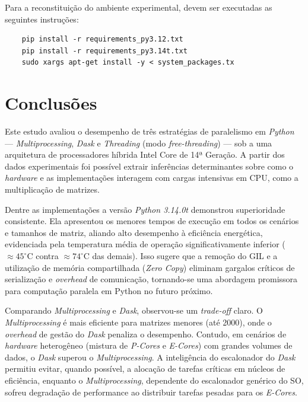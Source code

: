 \documentclass[acmsmall]{acmart}
\begin{document}
Para a reconstituição do ambiente experimental, devem ser executadas as seguintes instruções:

\begin{verbatim}
	pip install -r requirements_py3.12.txt
	pip install -r requirements_py3.14t.txt
	sudo xargs apt-get install -y < system_packages.tx
\end{verbatim}


\section{Conclusões}

Este estudo avaliou o desempenho de três estratégias de paralelismo em \textit{Python} — \textit{Multiprocessing}, \textit{Dask} e \textit{Threading} (modo \textit{free-threading}) — sob a uma arquitetura de processadores híbrida Intel Core de 14ª Geração. A partir dos dados experimentais foi possível extrair inferências determinantes sobre como o \textit{hardware} e as implementações interagem com cargas intensivas em CPU, como a multiplicação de matrizes.

Dentre as implementações a versão \textit{Python 3.14.0t} demonstrou superioridade consistente. Ela apresentou os menores tempos de execução em todos os cenários e tamanhos de matriz, aliando alto desempenho à eficiência energética, evidenciada pela temperatura média de operação significativamente inferior ($\approx 45^\circ\text{C}$ contra $\approx 74^\circ\text{C}$ das demais). Isso sugere que a remoção do GIL e a utilização de memória compartilhada (\textit{Zero Copy}) eliminam gargalos críticos de serialização e \textit{overhead} de comunicação, tornando-se uma abordagem promissora para computação paralela em Python no futuro próximo.

Comparando \textit{Multiprocessing} e \textit{Dask}, observou-se um \textit{trade-off} claro. O \textit{Multiprocessing} é mais eficiente para matrizes menores (até 2000), onde o \textit{overhead} de gestão do \textit{Dask} penaliza o desempenho. Contudo, em cenários de \textit{hardware} heterogêneo (mistura de \textit{P-Cores} e \textit{E-Cores}) com grandes volumes de dados, o \textit{Dask} superou o \textit{Multiprocessing}. A inteligência do escalonador do \textit{Dask} permitiu evitar, quando possível, a alocação de tarefas críticas em núcleos de eficiência, enquanto o \textit{Multiprocessing}, dependente do escalonador genérico do SO, sofreu degradação de performance ao distribuir tarefas pesadas para os \textit{E-Cores}.
\end{document}
